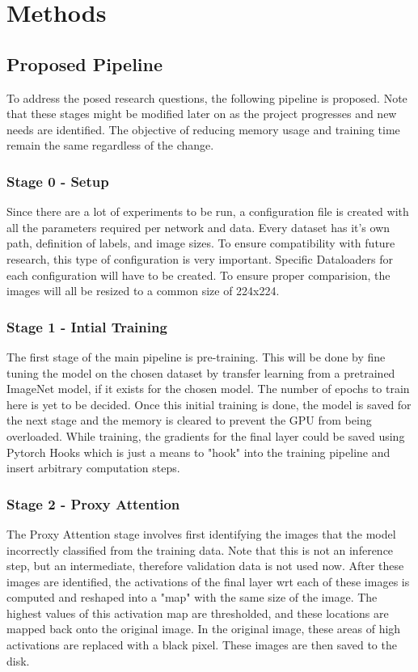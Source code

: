 \section{Methods} \label{section:methods}

\subsection{Proposed Pipeline}
To address the posed research questions, the following pipeline is proposed. Note that these stages might be modified later on as the project progresses and new needs are identified. The objective of reducing memory usage and training time remain the same regardless of the change.

\subsubsection*{Stage 0 - Setup}
Since there are a lot of experiments to be run, a configuration file is created with all the parameters required per network and data. Every dataset has it's own path, definition of labels, and image sizes. To ensure compatibility with future research, this type of configuration is very important. Specific Dataloaders for each configuration will have to be created.
To ensure proper comparision, the images will all be resized to a common size of 224x224. 

\subsubsection*{Stage 1 - Intial Training}
The first stage of the main pipeline is pre-training. This will be done by fine tuning the model on the chosen dataset by transfer learning from a pretrained ImageNet model, if it exists for the chosen model. The number of epochs to train here is yet to be decided. Once this initial training is done, the model is saved for the next stage and the memory is cleared to prevent the GPU from being overloaded.
While training, the gradients for the final layer could be saved using Pytorch Hooks which is just a means to "hook" into the training pipeline and insert arbitrary computation steps.

\subsubsection*{Stage 2 - Proxy Attention}
The Proxy Attention stage involves first identifying the images that the model incorrectly classified from the training data. Note that this is not an inference step, but an intermediate, therefore validation data is not used now. After these images are identified, the activations of the final layer wrt each of these images is computed and reshaped into a "map" with the same size of the image. The highest values of this activation map are thresholded, and these locations are mapped back onto the original image. In the original image, these areas of high activations are replaced with a black pixel. These images are then saved to the disk.

